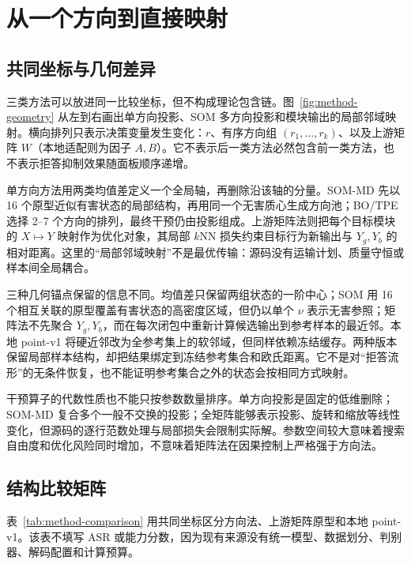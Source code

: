 \section{从一个方向到直接映射}
\label{sec:method-comparison}

\subsection{共同坐标与几何差异}

三类方法可以放进同一比较坐标，但不构成理论包含链。图~\ref{fig:method-geometry} 从左到右画出单方向投影、SOM 多方向投影和模块输出的局部邻域映射。横向排列只表示决策变量发生变化：$r$、有序方向组 $(r_1,\ldots,r_k)$、以及上游矩阵 $W$（本地适配则为因子 $A,B$）。它不表示后一类方法必然包含前一类方法，也不表示拒答抑制效果随面板顺序递增。



单方向方法用两类均值差定义一个全局轴，再删除沿该轴的分量\cite{arditi2024refusal}。SOM-MD 先以 16 个原型近似有害状态的局部结构，再用同一个无害质心生成方向池；BO/TPE 选择 2--7 个方向的排列，最终干预仍由投影组成\cite{piras2026som}。上游矩阵法则把每个目标模块的 $X\mapsto Y$ 映射作为优化对象，其局部 $k$NN 损失约束目标行为新输出与 $Y_g,Y_b$ 的相对距离。这里的“局部邻域映射”不是最优传输：源码没有运输计划、质量守恒或样本间全局耦合。

三种几何锚点保留的信息不同。均值差只保留两组状态的一阶中心；SOM 用 16 个相互关联的原型覆盖有害状态的高密度区域，但仍以单个 $\nu$ 表示无害参照；矩阵法不先聚合 $Y_g,Y_b$，而在每次闭包中重新计算候选输出到参考样本的最近邻。本地 point-v1 将硬近邻改为全参考集上的软邻域，但同样依赖冻结缓存。两种版本保留局部样本结构，却把结果绑定到冻结参考集合和欧氏距离。它不是对“拒答流形”的无条件恢复，也不能证明参考集合之外的状态会按相同方式映射。

干预算子的代数性质也不能只按参数数量排序。单方向投影是固定的低维删除；SOM-MD 复合多个一般不交换的投影；全矩阵能够表示投影、旋转和缩放等线性变化，但源码的逐行范数处理与局部损失会限制实际解。参数空间较大意味着搜索自由度和优化风险同时增加，不意味着矩阵法在因果控制上严格强于方向法。

\subsection{结构比较矩阵}

表~\ref{tab:method-comparison} 用共同坐标区分方向法、上游矩阵原型和本地 point-v1。该表不填写 ASR 或能力分数，因为现有来源没有统一模型、数据划分、判别器、解码配置和计算预算。

